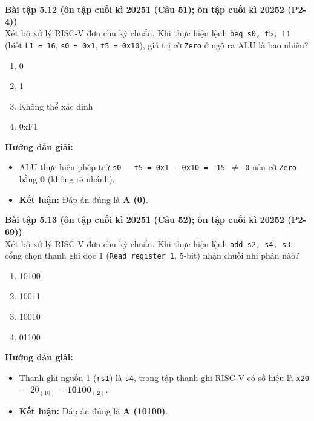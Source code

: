 \textbf{Bài tập 5.12 (ôn tập cuối kì 20251 (Câu 51); ôn tập cuối kì 20252 (P2-4))}\\
Xét bộ xử lý RISC-V đơn chu kỳ chuẩn. Khi thực hiện lệnh \texttt{beq s0, t5, L1} (biết \texttt{L1 = 16}, \texttt{s0 = 0x1}, \texttt{t5 = 0x10}), giá trị cờ \texttt{Zero} ở ngõ ra ALU là bao nhiêu?
\begin{enumerate}[label=\Alph*.]
    \item 0
    \item 1
    \item Không thể xác định
    \item 0xF1
\end{enumerate}
\textbf{Hướng dẫn giải:}
\begin{itemize}
    \item ALU thực hiện phép trừ \texttt{s0 - t5 = 0x1 - 0x10 = -15 $\ne$ 0} nên cờ \texttt{Zero} bằng $\mathbf{0}$ (không rẽ nhánh).
    \item \textbf{Kết luận:} Đáp án đúng là \textbf{A (0)}.
\end{itemize}

\textbf{Bài tập 5.13 (ôn tập cuối kì 20251 (Câu 52); ôn tập cuối kì 20252 (P2-69))}\\
Xét bộ xử lý RISC-V đơn chu kỳ chuẩn. Khi thực hiện lệnh \texttt{add s2, s4, s3}, cổng chọn thanh ghi đọc 1 (\texttt{Read register 1}, 5-bit) nhận chuỗi nhị phân nào?
\begin{enumerate}[label=\Alph*.]
    \item 10100
    \item 10011
    \item 10010
    \item 01100
\end{enumerate}
\textbf{Hướng dẫn giải:}
\begin{itemize}
    \item Thanh ghi nguồn 1 (\texttt{rs1}) là \texttt{s4}, trong tập thanh ghi RISC-V có số hiệu là \texttt{x20} $= 20_{(10)} = \mathbf{10100_{(2)}}$.
    \item \textbf{Kết luận:} Đáp án đúng là \textbf{A (10100)}.
\end{itemize}

